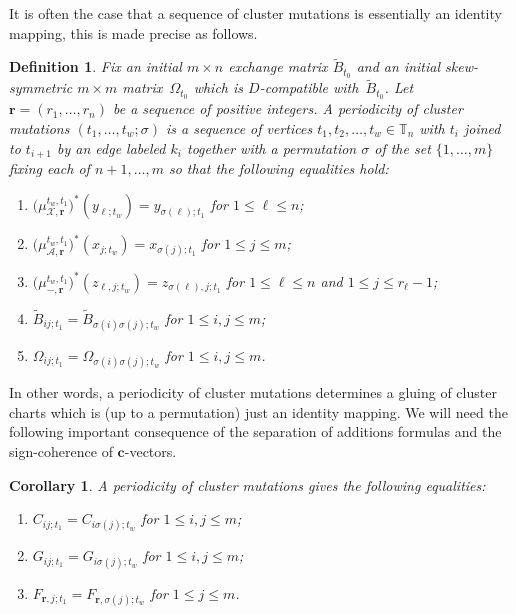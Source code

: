 \documentclass{amsart}
\newtheorem{corollary}[theorem]{Corollary}
\newtheorem{definition}[theorem]{Definition}
\numberwithin{equation}{section}
\newcommand{\bfc}{\mathbf{c}}
\newcommand{\bfr}{{\boldsymbol{r}}}
\newcommand{\cA}{\mathcal{A}}
\newcommand{\cX}{\mathcal{X}}
\newcommand{\TT}{\mathbb{T}}
\begin{document}
It is often the case that a sequence of cluster mutations is essentially an identity mapping, this is made precise as follows.
\begin{definition}
  \label{def:periodicity}
  Fix an initial $m\times n$ exchange matrix $\tilde B_{t_0}$ and an initial skew-symmetric $m\times m$ matrix~$\Omega_{t_0}$ which is $D$-compatible with~$\tilde B_{t_0}$.
  Let $\bfr=(r_1,\ldots,r_n)$ be a sequence of positive integers.
  A \emph{periodicity of cluster mutations} $(t_1,\ldots,t_w;\sigma)$ is a sequence of vertices $t_1,t_2,\ldots,t_w\in\TT_n$ with $t_i$ joined to $t_{i+1}$ by an edge labeled $k_i$ together with a permutation $\sigma$ of the set $\{1,\ldots,m\}$ fixing each of $n+1,\ldots,m$ so that the following equalities hold:
  \begin{enumerate}
    \item $\big(\mu_{\cX,\bfr}^{t_w,t_1}\big)^*(y_{\ell;t_w})=y_{\sigma(\ell);t_1}$ for $1\le\ell\le n$;
    \item $\big(\mu_{\cA,\bfr}^{t_w,t_1}\big)^*(x_{j;t_w})=x_{\sigma(j);t_1}$ for $1\le j\le m$;
    \item $\big(\mu_{-,\bfr}^{t_w,t_1}\big)^*(z_{\ell,j;t_w})=z_{\sigma(\ell),j;t_1}$ for $1\le\ell\le n$ and $1\le j\le r_\ell-1$;
    \item $\tilde B_{ij;t_1}=\tilde B_{\sigma(i)\sigma(j);t_w}$ for $1\le i,j\le m$;
    \item $\Omega_{ij;t_1}=\Omega_{\sigma(i)\sigma(j);t_w}$ for $1\le i,j\le m$.
  \end{enumerate}
\end{definition}
In other words, a periodicity of cluster mutations determines a gluing of cluster charts which is (up to a permutation) just an identity mapping.
We will need the following important consequence of the separation of additions formulas and the sign-coherence of $\bfc$-vectors.
\begin{corollary}
  \label{cor:periodicity}
  A periodicity of cluster mutations gives the following equalities:
  \begin{enumerate}
    \item $C_{ij;t_1}=C_{i\sigma(j);t_w}$ for $1\le i,j\le m$;
    \item $G_{ij;t_1}=G_{i\sigma(j);t_w}$ for $1\le i,j\le m$;
    \item $F_{\bfr,j;t_1}=F_{\bfr,\sigma(j);t_w}$ for $1\le j\le m$.
  \end{enumerate}
\end{corollary}
\end{document}
